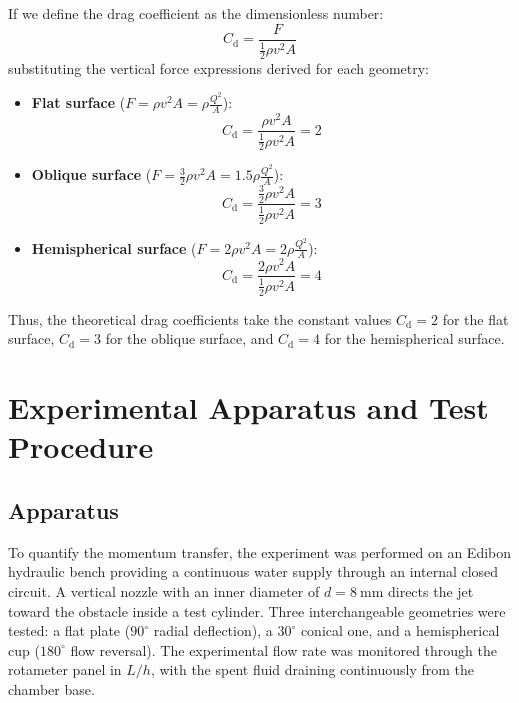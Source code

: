 \documentclass[11pt,a4paper]{article}
\numberwithin{equation}{section}
\begin{document}
If we define the drag coefficient as the dimensionless number:
\begin{equation}
    C_{\mathrm{d}} = \frac{F}{\frac{1}{2}\rho v^{2} A}
    \label{eq:cd_definition}
\end{equation}
substituting the vertical force expressions derived for each geometry:

\begin{itemize}
    \item \textbf{Flat surface} ($F = \rho v^{2} A = \rho \frac{Q^2}{A}$):
    \begin{equation}
        C_{\mathrm{d}} = \frac{\rho v^{2} A}{\frac{1}{2}\rho v^{2} A} = 2
    \end{equation}

    \item \textbf{Oblique surface} ($F = \frac{3}{2}\rho v^{2} A = 1.5 \rho \frac{Q^2}{A}$):
    \begin{equation}
        C_{\mathrm{d}} = \frac{\frac{3}{2}\rho v^{2} A}{\frac{1}{2}\rho v^{2} A} = 3
    \end{equation}

    \item \textbf{Hemispherical surface} ($F = 2\rho v^{2} A = 2\rho \frac{Q^2}{A}$):
    \begin{equation}
        C_{\mathrm{d}} = \frac{2\rho v^{2} A}{\frac{1}{2}\rho v^{2} A} = 4
    \end{equation}
\end{itemize}
Thus, the theoretical drag coefficients take the constant values $C_{\mathrm{d}} = 2$ for the flat surface, $C_{\mathrm{d}} = 3$ for the oblique surface, and $C_{\mathrm{d}} = 4$ for the hemispherical surface.
\section{Experimental Apparatus and Test Procedure}

\subsection{Apparatus}

To quantify the momentum transfer, the experiment was performed on an Edibon hydraulic bench providing a continuous water supply through an internal closed circuit. A vertical nozzle with an inner diameter of $d = \SI{8}{\milli\meter}$ directs the jet toward the obstacle inside a test cylinder. Three interchangeable geometries were tested: a flat plate ($90^\circ$ radial deflection), a $30^\circ$ conical one, and a hemispherical cup ($180^\circ$ flow reversal). The experimental flow rate was monitored through the rotameter panel in $\si{L/h}$, with the spent fluid draining continuously from the chamber base.
\end{document}
